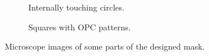 \begin{figure}[htb]
\begin{subfigure}[t]{0.24\linewidth}
  	\centering
  	\caption{Internally touching circles.}
  	\label{fig:TS_05_20_13_54_28}
  \end{subfigure}
     \hfill
     \begin{subfigure}[t]{0.24\linewidth}
  	\centering
  	\caption{Squares with OPC patterns.}
  	\label{fig:TS_05_20_13_54_51}
  \end{subfigure}
\caption{Microscope images of some parts of the designed mask.}
 \end{figure}



